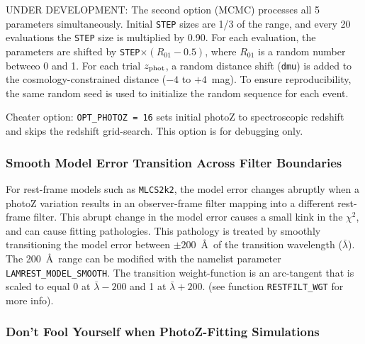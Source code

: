 \documentclass[12pt]{article}
\newcommand{\mlcs}{{\tt MLCS2k2}}
\newcommand{\Zphot}{z_{\rm phot}}
\begin{document}
UNDER DEVELOPMENT: The second option (MCMC) processes all 5 parameters simultaneously.
Initial {\tt STEP} sizes are 1/3 of the range, and every 20 evaluations
the {\tt STEP} size is multiplied by 0.90. For each evaluation, the
parameters are shifted by {\tt STEP}$\times(R_{01}-0.5)$,
where $R_{01}$ is a random number betweeo 0 and 1.
For each trial $\Zphot$, a random distance shift ({\tt dmu}) is added 
to the cosmology-constrained distance ($-4$ to $+4$~mag).
To ensure reproducibility, the same random seed is used to 
initialize the random sequence for each event.

Cheater option: {\tt OPT\_PHOTOZ = 16} sets initial
photoZ to spectroscopic redshift and skips the redshift grid-search. 
This option is for debugging only.


   \subsubsection{Smooth Model Error Transition Across Filter Boundaries}
   \label{sss:smooth_model}

For rest-frame models such as \mlcs, the model error
changes abruptly when a photoZ variation results
in an observer-frame filter mapping into a different
rest-frame filter. This abrupt change in the model error
causes a small kink in the $\chi^2$, and can cause
fitting pathologies.   This pathology is treated by
smoothly transitioning the model error between
$\pm 200$~\AA\ of the transition wavelength ($\bar{\lambda}$).
The 200~\AA\ range can be modified with the namelist
parameter {\tt LAMREST\_MODEL\_SMOOTH}.
The transition weight-function is an arc-tangent that is scaled
to equal 0 at $\bar{\lambda}-200$ and 1 at $\bar{\lambda}+200$.
(see function {\tt RESTFILT\_WGT} for more info).

   \subsubsection{Don't Fool Yourself when PhotoZ-Fitting Simulations}
   \label{sss:photoz_fool}
\end{document}

